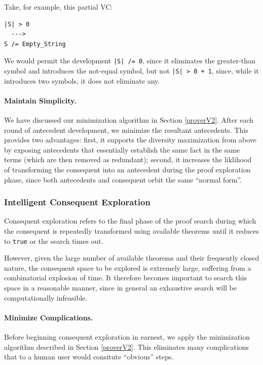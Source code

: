 Take, for example, this partial VC:

\begin{lstlisting}
|S| > 0
  --->
S /= Empty_String
\end{lstlisting}

We would permit the development \texttt{|S| /= 0}, since it eliminates the greater-than symbol and introduces the not-equal symbol, but not \texttt{|S| > 0 + 1}, since, while it introduces two symbols, it does not eliminate any.

\paragraph{Maintain Simplicity.}  We have discussed our minimization algorithm in Section \ref{proverV2}.  After each round of antecedent development, we minimize the resultant antecedents.  This provides two advantages: first, it supports the diversity maximization from above by exposing antecedents that essentially establish the same fact in the same terms (which are then removed as redundant); second, it increases the liklihood of transforming the consequent into an antecedent during the proof exploration phase, since both antecedents and consequent orbit the same ``normal form''.

		\subsubsection{Intelligent Consequent Exploration\label{consequentExploration}}

Consequent exploration refers to the final phase of the proof search during which the consequent is repeatedly transformed using available theorems until it reduces to \texttt{true} or the search times out.

However, given the large number of available theorems and their frequently closed nature, the consequent space to be explored is extremely large, suffering from a combinatorial explosion of time.  It therefore becomes important to search this space in a reasonable manner, since in general an exhaustive search will be computationally infeasible.

\paragraph{Minimize Complications.}  Before beginning consequent exploration in earnest, we apply the minimization algorithm described in Section \ref{proverV2}.  This eliminates many complications that to a human user would consitute ``obvious'' steps.

